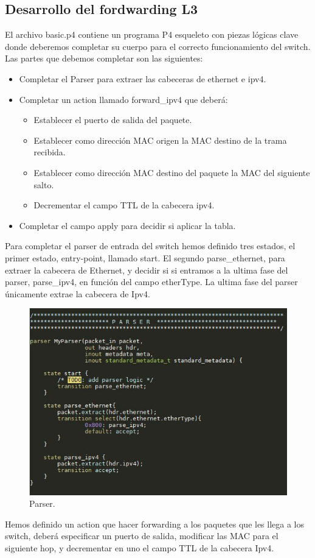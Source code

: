 \subsection{Desarrollo del fordwarding L3}
El archivo basic.p4 contiene un programa P4 esqueleto con piezas lógicas clave donde deberemos completar su cuerpo para el correcto funcionamiento del switch. Las partes que debemos completar son las siguientes:
\begin{itemize}
    \item Completar el Parser para extraer las cabeceras de ethernet e ipv4.
    \item Completar un action llamado forward\_ipv4 que deberá: 
        \begin{itemize}
            \item Establecer el puerto de salida del paquete. 
            \item Establecer como dirección MAC origen la MAC destino de la trama recibida. 
            \item Establecer como dirección MAC destino del paquete la MAC del siguiente salto.
            \item Decrementar el campo TTL de la cabecera ipv4.
        \end{itemize}
    
    \item Completar el campo apply para decidir si aplicar la tabla.
\end{itemize}
\newpage
Para completar el parser de entrada del switch hemos definido tres estados, el primer estado, entry-point, llamado start. El segundo parse\_ethernet, para extraer la cabecera de Ethernet, y decidir si si entramos a la ultima fase del parser, parse\_ipv4, en función del campo etherType. La ultima fase del parser únicamente extrae la cabecera de Ipv4. 
\begin{figure}[!htb]
  \centering
    \includegraphics[width=0.8\linewidth]{./img/test/2.JPG}
    \caption{Parser.}
  \label{fig:yo}
\end{figure}
\newline
Hemos definido un action que hacer forwarding a los paquetes que les llega a los switch, deberá especificar un puerto de salida, modificar las MAC para el siguiente hop, y decrementar en uno el campo TTL de la cabecera Ipv4. \newline

